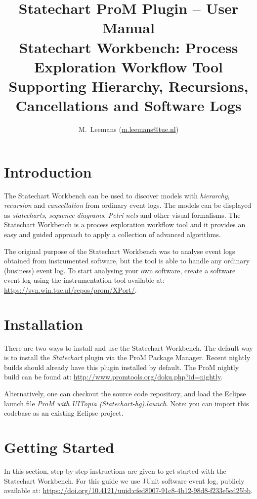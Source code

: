 \documentclass{article}
\begin{document}
\title{Statechart ProM Plugin -- User Manual\\ \vspace*{0.6em} 
{\large Statechart Workbench: Process Exploration Workflow Tool\\ \vspace*{-0.4em} 
Supporting Hierarchy, Recursions, Cancellations and Software Logs
}}
\author{M.~Leemans (\href{mailto:m.leemans@tue.nl}{m.leemans@tue.nl})}
\maketitle

\section{Introduction}
The Statechart Workbench can be used to discover models with \emph{hierarchy},
\emph{recursion} and \emph{cancellation} from ordinary event logs.
The models can be displayed as \emph{statecharts}, \emph{sequence diagrams}, \emph{Petri nets} and other visual formalisms.
The Statechart Workbench is a process exploration workflow tool and it provides 
an easy and guided approach to apply a collection of advanced algorithms. 

The original purpose of the Statechart Workbench was to analyse event logs
obtained from instrumented software, but the tool is able to handle any 
ordinary (business) event log.
To start analysing your own software, create a software event log using
the instrumentation tool available at: \url{https://svn.win.tue.nl/repos/prom/XPort/}.

\section{Installation}
There are two ways to install and use the Statechart Workbench.
The default way is to install the \emph{Statechart} plugin via the ProM Package Manager.
Recent nightly builds should already have this plugin installed by default.
The ProM nightly build can be found at: \url{http://www.promtools.org/doku.php?id=nightly}.

Alternatively, one can checkout the source code repository, 
and load the Eclipse launch file \emph{ProM with UITopia (Statechart-hg).launch}.
Note: you can import this codebase as an existing Eclipse project.

\section{Getting Started}
In this section, step-by-step instructions are given to get started with the Statechart Workbench.
For this guide we use JUnit software event log, publicly available at: 
\url{https://doi.org/10.4121/uuid:cfed8007-91c8-4b12-98d8-f233e5cd25bb}.
\end{document}
